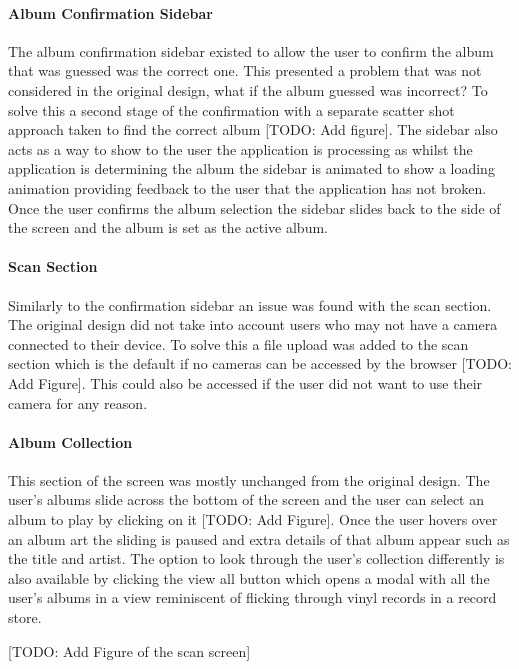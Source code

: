 \paragraph{Album Confirmation Sidebar}
The album confirmation sidebar existed to allow the user to confirm the album that was guessed was the correct one. This presented a problem that was not considered in the original design, what if the album guessed was incorrect? To solve this a second stage of the confirmation with a separate scatter shot approach taken to find the correct album [TODO: Add figure]. The sidebar also acts as a way to show to the user the application is processing as whilst the application is determining the album the sidebar is animated to show a loading animation providing feedback to the user that the application has not broken. Once the user confirms the album selection the sidebar slides back to the side of the screen and the album is set as the active album.

\paragraph{Scan Section}
Similarly to the confirmation sidebar an issue was found with the scan section. The original design did not take into account users who may not have a camera connected to their device. To solve this a file upload was added to the scan section which is the default if no cameras can be accessed by the browser [TODO: Add Figure]. This could also be accessed if the user did not want to use their camera for any reason.

\paragraph{Album Collection}
This section of the screen was mostly unchanged from the original design. The user's albums slide across the bottom of the screen and the user can select an album to play by clicking on it [TODO: Add Figure]. Once the user hovers over an album art the sliding is paused and extra details of that album appear such as the title and artist. The option to look through the user's collection differently is also available by clicking the view all button which opens a modal with all the user's albums in a view reminiscent of flicking through vinyl records in a record store.

[TODO: Add Figure of the scan screen]

